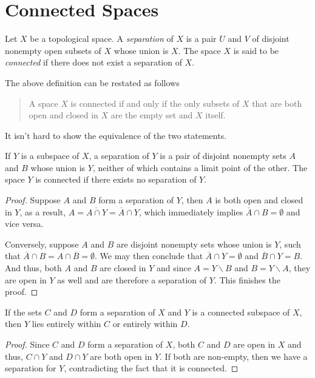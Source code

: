 \section{Connected Spaces}
\begin{definition}
    Let $X$ be a topological space. A \textit{separation} of $X$ is a pair $U$ and $V$ of disjoint nonempty open subsets of $X$ whose union is $X$. The space $X$ is said to be \textit{connected} if there does not exist a separation of $X$.
\end{definition}

The above definition can be restated as follows 
\begin{quote}
    A space $X$ is connected if and only if the only subsets of $X$ that are both open and closed in $X$ are the empty set and $X$ itself.
\end{quote}
It isn't hard to show the equivalence of the two statements.

\begin{lemma}
    If $Y$ is a subspace of $X$, a separation of $Y$ is a pair of disjoint nonempty sets $A$ and $B$ whose union is $Y$, neither of which contains a limit point of the other. The space $Y$ is connected if there exists no separation of $Y$.
\end{lemma}
\begin{proof}
    Suppose $A$ and $B$ form a separation of $Y$, then $A$ is both open and closed in $Y$, as a result, $A = \overline{A\cap Y} = \overline{A}\cap Y$, which immediately implies $\overline{A}\cap B = \emptyset$ and vice versa.

    Conversely, suppose $A$ and $B$ are disjoint nonempty sets whose union is $Y$, such that $\overline{A}\cap B = A\cap\overline{B} = \emptyset$. We may then conclude that $\overline{A}\cap Y = \emptyset$ and $\overline{B}\cap Y = B$. And thus, both $A$ and $B$ are closed in $Y$ and since $A = Y\backslash B$ and $B = Y\backslash A$, they are open in $Y$ as well and are therefore a separation of $Y$. This finishes the proof.
\end{proof}

\begin{lemma}
    If the sets $C$ and $D$ form a separation of $X$ and $Y$ is a connected subspace of $X$, then $Y$ lies entirely within $C$ or entirely within $D$.
\end{lemma}
\begin{proof}
    Since $C$ and $D$ form a separation of $X$, both $C$ and $D$ are open in $X$ and thus, $C\cap Y$ and $D\cap Y$ are both open in $Y$. If both are non-empty, then we have a separation for $Y$, contradicting the fact that it is connected.
\end{proof}

